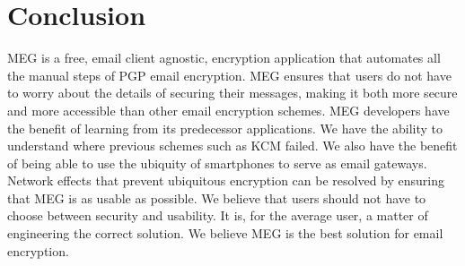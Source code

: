\documentclass{sig-alternate-05-2015}
\begin{document}
\section{Conclusion}
\par MEG is a free, email client agnostic, encryption application that automates all the manual steps of PGP email encryption. MEG ensures that users do not have to worry about the details of securing their messages, making it both more secure and more accessible than other email encryption schemes. MEG developers have the benefit of learning from its predecessor applications. We have the ability to understand where previous schemes such as KCM failed. We also have the benefit of being able to use the ubiquity of smartphones to serve as email gateways. Network effects that prevent ubiquitous encryption can be resolved by ensuring that MEG is as usable as possible. We believe that users should not have to choose between security and usability. It is, for the average user, a matter of engineering the correct solution. We believe MEG is the best solution for email encryption.



\end{document}
